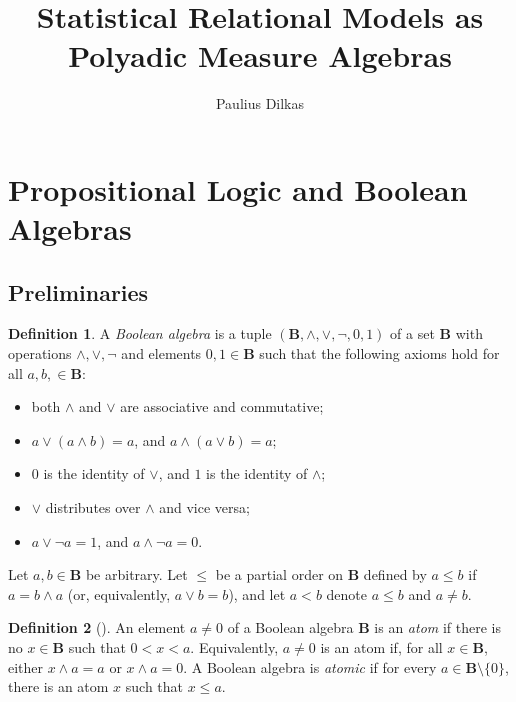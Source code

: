 \documentclass{article}
\title{Statistical Relational Models as Polyadic Measure Algebras}
\author{Paulius Dilkas}
\theoremstyle{definition}
\newtheorem{definition}{Definition}
\theoremstyle{remark}
\begin{document}
\maketitle



\section{Propositional Logic and Boolean Algebras}

\subsection{Preliminaries}

\begin{definition} \label{def:ba}
  A \emph{Boolean algebra} is a tuple $(\mathbf{B}, \land, \lor, \neg, 0, 1)$ of
  a set $\mathbf{B}$ with operations $\land, \lor, \neg$ and elements $0, 1 \in
  \mathbf{B}$ such that the following axioms hold for all $a, b, \in
  \mathbf{B}$:
  \begin{itemize}
  \item both $\land$ and $\lor$ are associative and commutative;
  \item $a \lor (a \land b) = a$, and $a \land (a \lor b) = a$;
  \item $0$ is the identity of $\lor$, and $1$ is the identity of $\land$;
  \item $\lor$ distributes over $\land$ and vice versa;
  \item $a \lor \neg a = 1$, and $a \land \neg a = 0$.
  \end{itemize}

  Let $a, b \in \mathbf{B}$ be arbitrary. Let $\le$ be a partial order on
  $\mathbf{B}$ defined by $a \le b$ if $a = b \land a$ (or, equivalently, $a
  \lor b = b$), and let $a < b$ denote $a \le b$ and $a \ne b$.
\end{definition}

\begin{definition}[\cite{DBLP:books/daglib/0090259,levasseur2012applied}]
  An element $a \ne 0$ of a Boolean algebra $\mathbf{B}$ is an \emph{atom} if
  there is no $x \in \mathbf{B}$ such that $0 < x < a$. Equivalently, $a \ne 0$
  is an atom if, for all $x \in \mathbf{B}$, either $x \land a = a$ or $x \land
  a = 0$. A Boolean algebra is \emph{atomic} if for every $a \in \mathbf{B}
  \setminus \{0 \}$, there is an atom $x$ such that $x \le a$.
\end{definition}
\end{document}

